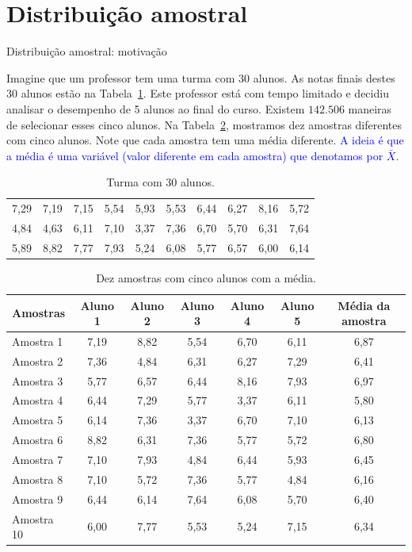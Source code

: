 \documentclass[9pt]{beamer}
\begin{document}
\section{Distribuição amostral}

\begin{frame}{Distribuição amostral: motivação}

{\scriptsize
Imagine que um professor tem uma turma com 30 alunos. As notas finais destes 30 alunos estão na Tabela~\ref{tab:dist_amostral}. Este professor está com tempo limitado e decidiu analisar o desempenho de 5 alunos ao final do curso. Existem $142.506$ maneiras de selecionar esses cinco alunos. Na Tabela~\ref{tab:amostras}, mostramos dez amostras diferentes com cinco alunos. Note que cada amostra tem uma média diferente. \textcolor{blue}{A ideia é que a média é uma variável (valor diferente em cada amostra) que denotamos por $\bar{X}$}.


\begin{table}[ht]
	\centering
	\begin{tabular}{cccccccccc}
		\toprule[0.05cm]
		7,29 & 7,19 & 7,15 & 5,54 & 5,93 & 5,53 & 6,44 & 6,27 & 8,16 & 5,72 \\ 
		4,84 & 4,63 & 6,11 & 7,10 & 3,37 & 7,36 & 6,70 & 5,70 & 6,31 & 7,64 \\ 
		5,89 & 8,82 & 7,77 & 7,93 & 5,24 & 6,08 & 5,77 & 6,57 & 6,00 & 6,14 \\ 
		\bottomrule[0.05cm]
	\end{tabular}
	\caption{Turma com 30 alunos.} 
	\label{tab:dist_amostral}
\end{table}



\begin{table}[ht]
	\centering
	\begin{tabular}{l|ccccc|c}
		\toprule[0.05cm]
		Amostras & Aluno 1 & Aluno 2 & Aluno 3 & Aluno 4 & Aluno 5 & Média da amostra \\ 
		\midrule[0.05cm]
		Amostra 1 &7,19 & 8,82 & 5,54 & 6,70 & 6,11 & 6,87 \\ 
		Amostra 2 &7,36 & 4,84 & 6,31 & 6,27 & 7,29 & 6,41 \\ 
		Amostra 3 & 5,77 & 6,57 & 6,44 & 8,16 & 7,93 & 6,97 \\ 
		Amostra 4 & 6,44 & 7,29 & 5,77 & 3,37 & 6,11 & 5,80 \\ 
		Amostra 5 & 6,14 & 7,36 & 3,37 & 6,70 & 7,10 & 6,13 \\ 
		Amostra 6 & 8,82 & 6,31 & 7,36 & 5,77 & 5,72 & 6,80 \\ 
		Amostra 7 & 7,10 & 7,93 & 4,84 & 6,44 & 5,93 & 6,45 \\ 
		Amostra 8 & 7,10 & 5,72 & 7,36 & 5,77 & 4,84 & 6,16 \\ 
		Amostra 9 & 6,44 & 6,14 & 7,64 & 6,08 & 5,70 & 6,40 \\ 
		Amostra 10 & 6,00 & 7,77 & 5,53 & 5,24 & 7,15 & 6,34 \\ 
		\bottomrule[0.05cm]
	\end{tabular}
	\caption{Dez amostras com cinco alunos com a média.} 
	\label{tab:amostras}
\end{table}
}
\end{frame}
\end{document}
